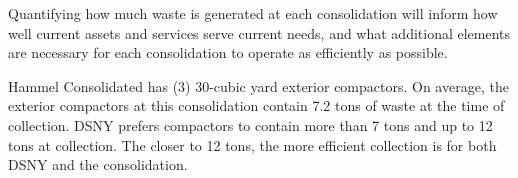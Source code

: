 
    Quantifying how much waste is generated at each consolidation will inform how well current assets and services serve current needs, and what additional elements are necessary for each consolidation to operate as efficiently as possible.
    
    Hammel Consolidated has (3) 30-cubic yard exterior compactors. On average, the exterior compactors at this consolidation contain 7.2 tons of waste at the time of collection. DSNY prefers compactors to contain more than 7 tons and up to 12 tons at collection. The closer to 12 tons, the more efficient collection is for both DSNY and the consolidation.